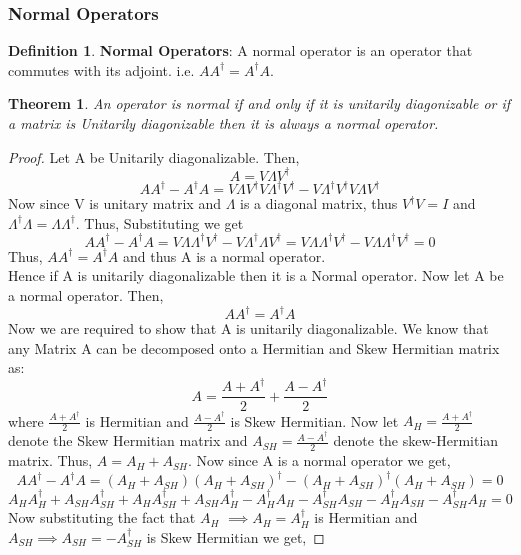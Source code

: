 \documentclass[12pt, oneside]{book}
\newtheorem{theorem}{Theorem}[section]
\theoremstyle{definition}
\newtheorem{definition}{Definition}[section]
\theoremstyle{definition}
\theoremstyle{remark}
\begin{document}
\subsubsection{Normal Operators}
\begin{definition}
\textbf{Normal Operators}: A normal operator is an operator that commutes with its adjoint. i.e. $AA^{\dagger}=A^{\dagger}A$.\\
\end{definition}
\begin{theorem}
    An operator is normal if and only if it is unitarily diagonizable or if a matrix is Unitarily diagonizable then it is always a normal operator.
\end{theorem}
\begin{proof}
    Let A be Unitarily diagonalizable. Then,
    \[ A=V\Lambda V^{\dagger} \]
    \[ AA^{\dagger} - A^{\dagger}A  = V\Lambda V^{\dagger} V \Lambda^{\dagger} V^{\dagger} - V\Lambda^{\dagger} V^{\dagger} V\Lambda V^{\dagger} \]
    Now since V is unitary matrix and $\Lambda$ is a diagonal matrix, thus $V^{\dagger}V=I$ and $\Lambda^{\dagger}\Lambda=\Lambda \Lambda^{\dagger}$. Thus, Substituting we get
    \[ AA^{\dagger} - A^{\dagger}A = V\Lambda \Lambda^{\dagger} V^{\dagger} - V\Lambda^{\dagger} \Lambda V^{\dagger} = V\Lambda \Lambda^{\dagger} V^{\dagger} - V\Lambda \Lambda^{\dagger} V^{\dagger} = 0 \]
    Thus, $AA^{\dagger}=A^{\dagger}A$ and thus A is a normal operator.\\
    Hence if A is unitarily diagonalizable then it is a Normal operator.
    Now let A be a normal operator. Then,
    \[ AA^{\dagger}=A^{\dagger}A \]
    Now we are required to show that A is unitarily diagonalizable. We know that any Matrix A can be decomposed onto a Hermitian and Skew Hermitian matrix as:
    \[ A=\frac{A+A^{\dagger}}{2} + \frac{A-A^{\dagger}}{2} \]
    where $\frac{A+A^{\dagger}}{2}$ is Hermitian and $\frac{A-A^{\dagger}}{2}$ is Skew Hermitian.
    Now let $A_H=\frac{A+A^{\dagger}}{2}$ denote the Skew Hermitian matrix and $A_{SH}=\frac{A-A^{\dagger}}{2}$ denote the skew-Hermitian matrix.
    Thus, $A=A_H+A_{SH}$. Now since A is a normal operator we get,
    \[ AA^{\dagger}-A^{\dagger}A=(A_H + A_{SH})(A_H + A_{SH})^{\dagger}-(A_H + A_{SH})^{\dagger}(A_H + A_{SH})=0 \]
    \[ A_HA_H^{\dagger}+A_{SH}A_{SH}^{\dagger}+A_HA_{SH}^{\dagger}+A_{SH}A_H^{\dagger}-A_H^{\dagger}A_H-A_{SH}^{\dagger}A_{SH}-A_H^{\dagger}A_{SH}-A_{SH}^{\dagger}A_H=0 \]
    Now substituting the fact that $A_H$ $\implies A_{H}=A_H^{\dagger}$ is Hermitian and $A_{SH} \implies A_{SH}=-A_{SH}^{\dagger}$ is Skew Hermitian we get,

\end{proof}
\end{document}
